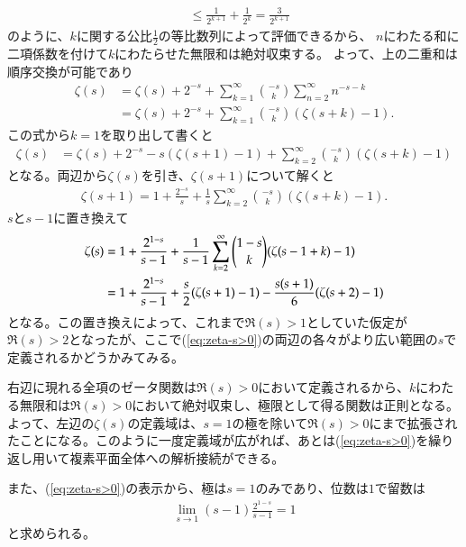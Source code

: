 \documentclass[11pt,b5paper,papersize,dvipdfmx]{jsbook}
\begin{document}
\begin{prf}
\begin{align*}
    &\le \frac1{2^{k+1}} + \frac1{2^k}
    = \frac3{2^{k+1}}
  \end{align*}
  のように、$k$に関する公比$\frac12$の等比数列によって評価できるから、
  $n$にわたる和に二項係数を付けて$k$にわたらせた無限和は絶対収束する。
  よって、上の二重和は順序交換が可能であり
  \begin{align*}
    \zeta(s) &= \zeta(s) + 2^{-s} + \sum_{k=1}^\infty \binom{-s}{k} \sum_{n=2}^\infty n^{-s-k}\\
    &= \zeta(s) + 2^{-s} + \sum_{k=1}^\infty \binom{-s}{k} (\zeta(s+k)-1).
  \end{align*}
  この式から$k=1$を取り出して書くと
  \begin{align*}
    \zeta(s) &= \zeta(s) + 2^{-s} - s(\zeta(s+1)-1)
      + \sum_{k=2}^\infty \binom{-s}{k} (\zeta(s+k)-1)
  \end{align*}
  となる。両辺から$\zeta(s)$を引き、$\zeta(s+1)$について解くと
  \begin{align*}
    \zeta(s+1) = 1 + \frac{2^{-s}}{s} + \frac1s \sum_{k=2}^\infty \binom{-s}{k} (\zeta(s+k)-1)
  .\end{align*}
  $s$と$s-1$に置き換えて
  \begin{align}
    \zeta(s) &= 1 + \frac{2^{1-s}}{s-1} + \frac1{s-1} \sum_{k=2}^\infty \binom{1-s}{k} (\zeta(s-1+k)-1)
    \label{eq:zeta-s>0}\\
    &= 1 + \frac{2^{1-s}}{s-1} + \frac{s}{2}(\zeta(s+1)-1)
      - \frac{s(s+1)}{6}(\zeta(s+2)-1) \notag
  \end{align}
  となる。この置き換えによって、これまで$\Re(s)>1$としていた仮定が$\Re(s)>2$となったが、ここで(\ref{eq:zeta-s>0})の両辺の各々がより広い範囲の$s$で定義されるかどうかみてみる。 \par 
  右辺に現れる全項のゼータ関数は$\Re(s)>0$において定義されるから、$k$にわたる無限和は$\Re(s)>0$において絶対収束し、極限として得る関数は正則となる。よって、左辺の$\zeta(s)$の定義域は、$s=1$の極を除いて$\Re(s)>0$にまで拡張されたことになる。このように一度定義域が広がれば、あとは(\ref{eq:zeta-s>0})を繰り返し用いて複素平面全体への解析接続ができる。\par
  また、(\ref{eq:zeta-s>0})の表示から、極は$s=1$のみであり、位数は$1$で留数は
  \begin{align*}
    \lim_{s\to 1} (s-1) \frac{2^{1-s}}{s-1} = 1
  \end{align*}
  と求められる。
\end{prf}
\end{document}
